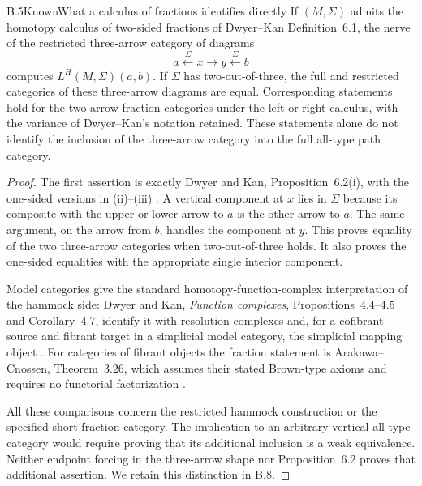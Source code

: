 \begin{result}{B.5}{Known}{What a calculus of fractions identifies directly}
If $(M,\Sigma)$ admits the homotopy calculus of two-sided fractions of Dwyer--Kan Definition~6.1, the nerve of the restricted three-arrow category of diagrams
\[
       a\xleftarrow{\Sigma}x\longrightarrow y
             \xleftarrow{\Sigma}b
\]
computes $L^H(M,\Sigma)(a,b)$. If $\Sigma$ has two-out-of-three, the full and restricted categories of these three-arrow diagrams are equal. Corresponding statements hold for the two-arrow fraction categories under the left or right calculus, with the variance of Dwyer--Kan's notation retained. These statements alone do not identify the inclusion of the three-arrow category into the full all-type path category.
\end{result}
\begin{proof}
The first assertion is exactly Dwyer and Kan, Proposition~6.2(i), with the one-sided versions in (ii)--(iii) \citep{DwyerKan1980Calculating}. A vertical component at $x$ lies in $\Sigma$ because its composite with the upper or lower arrow to $a$ is the other arrow to $a$. The same argument, on the arrow from $b$, handles the component at $y$. This proves equality of the two three-arrow categories when two-out-of-three holds. It also proves the one-sided equalities with the appropriate single interior component.

Model categories give the standard homotopy-function-complex interpretation of the hammock side: Dwyer and Kan, \emph{Function complexes}, Propositions~4.4--4.5 and Corollary~4.7, identify it with resolution complexes and, for a cofibrant source and fibrant target in a simplicial model category, the simplicial mapping object \citep{DwyerKan1980Function}. For categories of fibrant objects the fraction statement is Arakawa--Cnossen, Theorem~3.26, which assumes their stated Brown-type axioms and requires no functorial factorization \citep{ArakawaCnossenPATHS}.

All these comparisons concern the restricted hammock construction or the specified short fraction category. The implication to an arbitrary-vertical all-type category would require proving that its additional inclusion is a weak equivalence. Neither endpoint forcing in the three-arrow shape nor Proposition~6.2 proves that additional assertion. We retain this distinction in B.8.
\end{proof}

